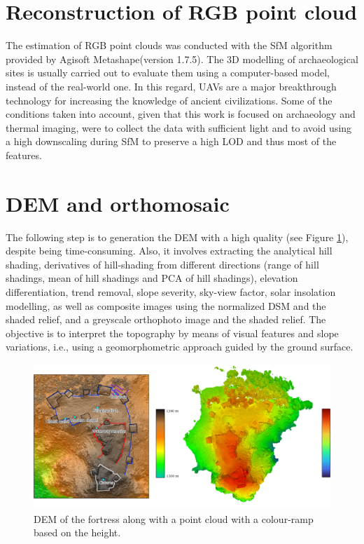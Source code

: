\section{Reconstruction of RGB point cloud}

The estimation of RGB point clouds was conducted with the SfM algorithm provided by Agisoft Metashape\textregistered (version 1.7.5). The 3D modelling of archaeological sites is usually carried out to evaluate them using a computer-based model, instead of the real-world one. In this regard, UAVs are a major breakthrough technology for increasing the knowledge of ancient civilizations. Some of the conditions taken into account, given that this work is focused on archaeology and thermal imaging, were to collect the data with sufficient light and to avoid using a high downscaling during SfM to preserve a high LOD and thus most of the features.

\section{DEM and orthomosaic}

The following step is to generation the DEM with a high quality (see Figure \ref{fig:thermal_castle_dem}), despite being time-consuming. Also, it involves extracting the analytical hill shading, derivatives of hill-shading from different directions (range of hill shadings, mean of hill shadings and PCA of hill shadings), elevation differentiation, trend removal, slope severity, sky-view factor, solar insolation modelling, as well as composite images using the normalized DSM and the shaded relief, and a greyscale orthophoto image and the shaded relief. The objective is to interpret the topography by means of visual features and slope variations, i.e., using a geomorphometric approach guided by the ground surface. 

\begin{figure}[htbp]
    \centering
    \includegraphics[width=\linewidth]{figs/castle_puerta_arenas/fortress_height.png}
    \caption{DEM of the fortress along with a point cloud with a colour-ramp based on the height. }
    \label{fig:thermal_castle_dem}
\end{figure}

